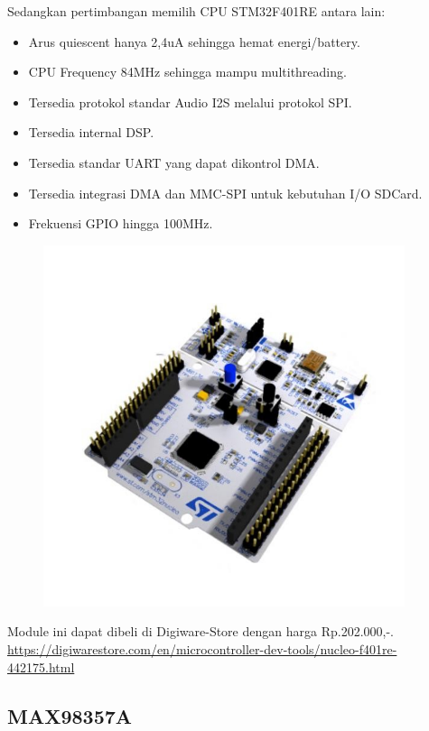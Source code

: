 \documentclass[12pt,]{article}
\begin{document}
	Sedangkan pertimbangan memilih CPU STM32F401RE antara lain:
	\begin{itemize}
		\item Arus quiescent hanya 2,4uA sehingga hemat energi/battery.
		\item CPU Frequency 84MHz sehingga mampu multithreading.
		\item Tersedia protokol standar Audio I2S melalui protokol SPI.
		\item Tersedia internal DSP.
		\item Tersedia standar UART yang dapat dikontrol DMA.
		\item Tersedia integrasi DMA dan MMC-SPI untuk kebutuhan I/O SDCard.
		\item Frekuensi GPIO hingga 100MHz.
	\end{itemize}

	\begin{figure}[!ht]
		\centering
		\includegraphics[width=300pt]{images/nucleo-f401re}
	\end{figure}

	Module ini dapat dibeli di Digiware-Store dengan harga Rp.202.000,-.\\
	\url{https://digiwarestore.com/en/microcontroller-dev-tools/nucleo-f401re-442175.html}
	
	\newpage
	\subsection{MAX98357A}
	
\end{document}
